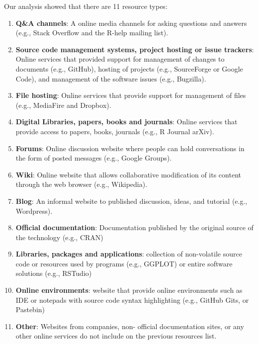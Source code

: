 \documentclass{sig-alternate-05-2015}
\begin{document}
	Our analysis showed that there are 11 resource types:
	\begin{enumerate}[\bfseries (1)]
		\item \textbf{Q\&A channels}: A online media channels for asking questions and answers (e.g., Stack Overflow and the R-help mailing list).
		\item \textbf{Source code management systems, project hosting or issue trackers}: Online services that provided support for management of changes to documents (e.g., GitHub), hosting of projects (e.g., SourceForge or Google Code), and management of the software issues (e.g., Bugzilla).
		\item \textbf{File hosting}: Online services that provide support for management of files (e.g., MediaFire and Dropbox).
		\item \textbf{Digital Libraries, papers, books and journals}: Online services that provide access to papers, books, journals (e.g., R Journal arXiv).
		\item \textbf{Forums}: Online discussion website where people can hold conversations in the form of posted messages (e.g., Google Groups).
		\item \textbf{Wiki}: Online website that allows collaborative modification of its content through the web browser (e.g., Wikipedia).
		\item \textbf{Blog}: An informal website to published discussion, ideas, and tutorial (e.g., Wordpress).
		\item \textbf{Official documentation}: Documentation published by the original source of the technology (e.g., CRAN)
		\item \textbf{Libraries, packages and applications}: collection of non-volatile source code or resources used by programs (e.g., GGPLOT) or entire software solutions (e.g., RSTudio)
		\item \textbf{Online environments}: website that provide online environments such as IDE or notepads with source code syntax highlighting (e.g., GitHub Gits, or Pastebin)
		\item \textbf{Other}: Websites from companies, non- official documentation sites, or any other online services do not include on the previous resources list.
	\end{enumerate}
\end{document}

